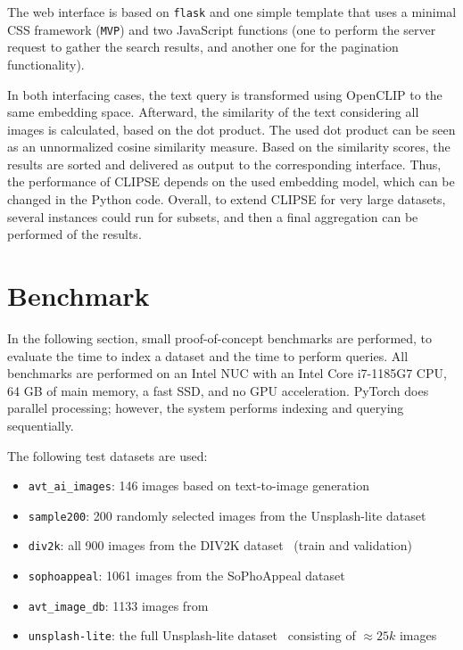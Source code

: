 \documentclass{article}
\begin{document}
The web interface is based on \texttt{flask} and one simple template that uses a minimal CSS framework (\texttt{MVP}) and two JavaScript functions (one to perform the server request to gather the search results, and another one for the pagination functionality).

In both interfacing cases, the text query is transformed using OpenCLIP to the same embedding space.
Afterward, the similarity of the text considering all images is calculated, based on the dot product.
The used dot product can be seen as an unnormalized cosine similarity measure.
Based on the similarity scores, the results are sorted and delivered as output to the corresponding interface.
Thus, the performance of CLIPSE depends on the used embedding model, which can be changed in the Python code.
Overall, to extend CLIPSE for very large datasets, several instances could run for subsets, and then a final aggregation can be performed of the results.

\section{Benchmark}
In the following section, small proof-of-concept benchmarks are performed, to evaluate the time to index a dataset and the time to perform queries.
All benchmarks are performed on an Intel NUC with an Intel Core i7-1185G7 CPU, 64 GB of main memory, a fast SSD, and no GPU acceleration.
PyTorch does parallel processing; however, the system performs indexing and querying sequentially.

The following test datasets are used:
\begin{itemize}
    \item \texttt{avt\_ai\_images}: 146 images based on text-to-image generation~\cite{goering2023ai,goering2023aiquality}
    \item \texttt{sample200}: 200 randomly selected images from the Unsplash-lite dataset~\cite{unsplash}
    \item \texttt{div2k}: all 900 images from the DIV2K dataset~\cite{agustsson2017ntire} (train and validation)
    \item \texttt{sophoappeal}: 1061 images from the SoPhoAppeal dataset~\cite{goering2023imageappeal}
    \item \texttt{avt\_image\_db}: 1133 images from~\cite{goering2019Intra}
    \item \texttt{unsplash-lite}: the full Unsplash-lite dataset~\cite{unsplash} consisting of $\approx 25k$ images
\end{itemize}
\end{document}
